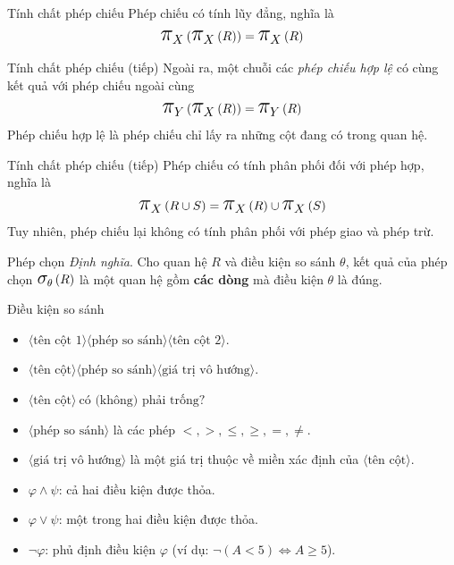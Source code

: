\documentclass[11pt]{beamer}
\newcommand{\mmm}[1]{\mathlarger{\mathlarger{\mathlarger#1}}}%
\newcommand{\ppi}[2]{\mmm{\pi}_{#1}\left(#2\right)}%
\newcommand{\psig}[2]{\mmm{\sigma}_{#1}\left(#2\right)}%
\begin{document}
  \begin{frame}{Tính chất phép chiếu}
    Phép chiếu có tính lũy đẳng, nghĩa là
    $$\ppi{X}{\ppi{X}{R}} = \ppi{X}{R}$$
  \end{frame}
  \begin{frame}{Tính chất phép chiếu (tiếp)}
    Ngoài ra, một chuỗi các \textit{phép chiếu hợp lệ} có cùng kết quả với phép chiếu ngoài cùng
    $$\ppi{Y}{\ppi{X}{R}} = \ppi{Y}{R}$$
    Phép chiếu hợp lệ là phép chiếu chỉ lấy ra những cột đang có trong quan hệ.
  \end{frame}
  \begin{frame}{Tính chất phép chiếu (tiếp)}
    Phép chiếu có tính phân phối đối với phép hợp, nghĩa là
    $$\ppi{X}{R \cup S} = \ppi{X}{R} \cup \ppi{X}{S}$$
    Tuy nhiên, phép chiếu lại không có tính phân phối với phép giao và phép trừ.
  \end{frame}
  \begin{frame}{Phép chọn}
  \textit{Định nghĩa}. Cho quan hệ $R$ và điều kiện so sánh $\theta$, kết quả của 
  phép chọn $\psig{\theta}{R}$ là một quan hệ gồm \textbf{các dòng} mà điều kiện $\theta$ là đúng.
  \end{frame}
  \begin{frame}{Điều kiện so sánh}
    \begin{itemize}
      \item<2-> $\langle\text{tên cột 1}\rangle\langle\text{phép so sánh}\rangle\langle\text{tên cột 2}\rangle$.
      \item<3-> $\langle\text{tên cột}\rangle\langle\text{phép so sánh}\rangle\langle\text{giá trị vô hướng}\rangle$.
      \item<4-> $\langle\text{tên cột}\rangle~\text{có (không) phải trống?}$
    \end{itemize}
  \end{frame}
  \begin{frame}
    \begin{itemize}
      \item<2-> $\langle\text{phép so sánh}\rangle$ là các phép $<, >, \leq, \geq, =, \neq$.
      \item<3-> $\langle\text{giá trị vô hướng}\rangle$ là một giá trị thuộc về miền xác định của $\langle\text{tên cột}\rangle$.
    \end{itemize}
  \end{frame}
  \begin{frame}
    \begin{itemize}
      \item<2-> $\varphi \wedge \psi$: cả hai điều kiện được thỏa.
      \item<3-> $\varphi \vee \psi$: một trong hai điều kiện được thỏa.
      \item<4-> $\neg \varphi$: phủ định điều kiện $\varphi$ (ví dụ: $\neg (A < 5) \Leftrightarrow A \geq 5$).
    \end{itemize}
  \end{frame}
\end{document}
